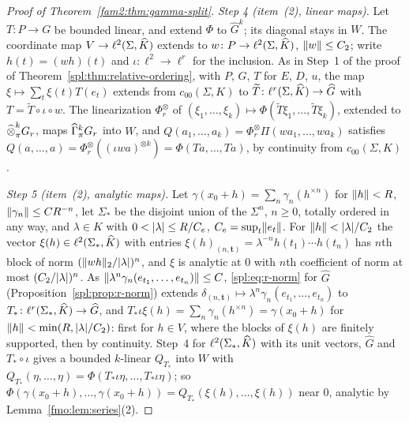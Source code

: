 \begin{proof}[Proof of Theorem~\ref{fam2:thm:gamma-split}]
\emph{Step 4 (item~(2), linear maps).} Let $T\colon P\to G$ be bounded linear, and extend $\Phi$ to $\widehat G^k$; its
diagonal stays in $W$. The coordinate map $V\to\ell^2(\Sigma,\widehat K)$ extends to $w\colon P\to\ell^2(\Sigma,\widehat K)$,
$\lVert w\rVert\le C_2$; write $h(t)=(wh)(t)$ and $\iota\colon\ell^2\to\ell^r$ for the inclusion. As in Step~1 of the proof of
Theorem~\ref{spl:thm:relative-ordering}, with $P$, $G$, $T$ for $E$, $D$, $u$, the map $\xi\mapsto\sum_t\xi(t)T(e_t)$
extends from $c_{00}(\Sigma,K)$ to $\widetilde T\colon\ell^r(\Sigma,\widehat K)\to\widehat G$ with $T=\widetilde T\circ\iota\circ w$.
The linearization $\Phi_r^\otimes$ of $(\xi_1,\dots,\xi_k)\mapsto\Phi(\widetilde T\xi_1,\dots,\widetilde T\xi_k)$, extended
to $\mathbin{\widehat\otimes}^k_\pi G_r$, maps $\widehat\Gamma^k_\pi G_r$ into $W$, and $Q(a_1,\dots,a_k)=\Phi_r^\otimes\Pi(wa_1,\dots,wa_k)$ satisfies
$Q(a,\dots,a)=\Phi_r^\otimes((\iota wa)^{\otimes k})=\Phi(Ta,\dots,Ta)$, by continuity from $c_{00}(\Sigma,K)$.

\emph{Step 5 (item~(2), analytic maps).} Let $\gamma(x_0+h)=\sum_n\gamma_n(h^{\times n})$ for $\lVert h\rVert<R$,
$\lVert \gamma_n\rVert\le CR^{-n}$, let $\Sigma_*$ be the disjoint union of the $\Sigma^n$, $n\ge0$, totally ordered in any way,
and $\lambda\in K$ with $0<\lvert \lambda\rvert\le R/C_e$, $C_e=\sup_t\lVert e_t\rVert$. For $\lVert h\rVert<\lvert \lambda\rvert/C_2$ the vector
$\xi(h)\in\ell^2(\Sigma_*,\widehat K)$
with entries $\xi(h)_{(n,\mathbf t)}=\lambda^{-n}h(t_1)\cdots h(t_n)$ has $n$th block of norm
$(\lVert wh\rVert_2/\lvert \lambda\rvert)^n$, and $\xi$ is analytic at $0$ with $n$th coefficient of norm at most $(C_2/\lvert \lambda\rvert)^n$. As
$\lVert \lambda^n\gamma_n(e_{t_1},\dots,e_{t_n})\rVert\le C$, \eqref{spl:eq:r-norm} for $\widehat G$
(Proposition~\ref{spl:prop:r-norm}) extends $\delta_{(n,\mathbf t)}\mapsto
\lambda^n\gamma_n(e_{t_1},\dots,e_{t_n})$ to $T_*\colon\ell^r(\Sigma_*,\widehat K)\to\widehat G$, and $T_*\iota\xi(h)=
\sum_n\gamma_n(h^{\times n})=\gamma(x_0+h)$ for $\lVert h\rVert<\min(R,\lvert \lambda\rvert/C_2)$: first for $h\in V$, where the blocks of
$\xi(h)$ are finitely supported, then by continuity. Step~4 for
$\ell^2(\Sigma_*,\widehat K)$ with its unit vectors, $\widehat G$ and $T_*\circ\iota$ gives a bounded $k$-linear $Q_{T_*}$ into $W$
with $Q_{T_*}(\eta,\dots,\eta)=\Phi(T_*\iota\eta,\dots,T_*\iota\eta)$; so $\Phi(\gamma(x_0+h),\dots,\gamma(x_0+h))=
Q_{T_*}(\xi(h),\dots,\xi(h))$ near $0$, analytic by Lemma~\ref{fmo:lem:series}(2).


\end{proof}
